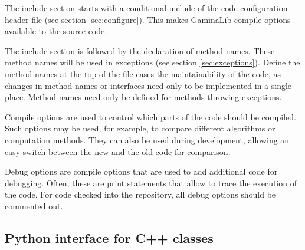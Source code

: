 \documentclass{article}[12pt,a4]
\begin{document}
The include section starts with a conditional include of the code configuration header file
(see section \ref{sec:configure}).
This makes GammaLib compile options available to the source code.

The include section is followed by the declaration of method names.
These method names will be used in exceptions (see section \ref{sec:exceptions}).
Define the method names at the top of the file eases the maintainability of the code,
as changes in method names or interfaces need only to be implemented in a single 
place.
Method names need only be defined for methods throwing exceptions.

Compile options are used to control which parts of the code should be compiled.
Such options may be used, for example, to compare different algorithms or computation
methods.
They can also be used during development, allowing an easy switch between the new and
the old code for comparison.

Debug options are compile options that are used to add additional code for debugging.
Often, these are print statements that allow to trace the execution of the code.
For code checked into the repository, all debug options should be commented out.


\subsection{Python interface for C++ classes}
\label{sec:pyhton}
\end{document}
